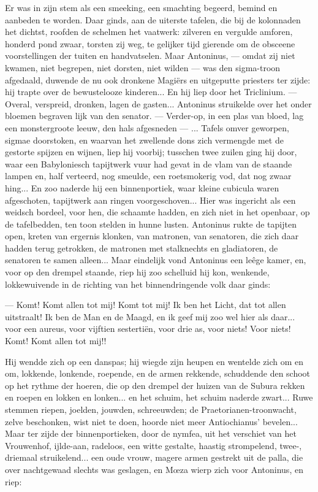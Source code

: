 \documentclass[a4paper, 12pt, oneside, dutch]{article}
\begin{document}
Er was in zijn stem als een smeeking, een smachting begeerd, bemind en aanbeden te worden. Daar ginds, aan de uiterste tafelen, die bij de kolonnaden het dichtst, roofden de schelmen het vaatwerk: zilveren en vergulde amforen, honderd pond zwaar, torsten zij weg, te gelijker tijd gierende om de obsceene voorstellingen der tuiten en handvatselen. Maar Antoninus, --- omdat zij niet kwamen, niet begrepen, niet dorsten, niet wilden --- was den sigma-troon afgedaald, duwende de nu ook dronkene Magiërs en uitgeputte priesters ter zijde: hij trapte over de bewustelooze kinderen... En hij liep door het Triclinium. --- Overal, verspreid, dronken, lagen de gasten... Antoninus struikelde over het onder bloemen begraven lijk van den senator. --- Verder-op, in een plas van bloed, lag een monstergroote leeuw, den hals afgesneden --- ... Tafels omver geworpen, sigmae doorstoken, en waarvan het zwellende dons zich vermengde met de gestorte spijzen en wijnen, liep hij voorbij; tusschen twee zuilen ging hij door, waar een Babyloniesch tapijtwerk vuur had gevat in de vlam van de staande lampen en, half verteerd, nog smeulde, een roetsmokerig vod, dat nog zwaar hing... En zoo naderde hij een binnenportiek, waar kleine cubicula waren afgeschoten, tapijtwerk aan ringen voorgeschoven... Hier was ingericht als een weidsch bordeel, voor hen, die schaamte hadden, en zich niet in het openbaar, op de tafelbedden, ten toon stelden in hunne lusten. Antoninus rukte de tapijten open, kreten van ergernis klonken, van matronen, van senatoren, die zich daar hadden terug getrokken, de matronen met stalknechts en gladiatoren, de senatoren te samen alleen... Maar eindelijk vond Antoninus een leêge kamer, en, voor op den drempel staande, riep hij zoo schelluid hij kon, wenkende, lokkewuivende in de richting van het binnendringende volk daar ginds:

--- Komt! Komt allen tot mij! Komt tot mij! Ik ben het Licht, dat tot allen uitstraalt! Ik ben de Man en de Maagd, en ik geef mij zoo wel hier als daar... voor een aureus, voor vijftien sestertiën, voor drie as, voor niets! Voor niets! Komt! Komt allen tot mij!!

Hij wendde zich op een danspas; hij wiegde zijn heupen en wentelde zich om en om, lokkende, lonkende, roepende, en de armen rekkende, schuddende den schoot op het rythme der hoeren, die op den drempel der huizen van de Subura rekken en roepen en lokken en lonken... en het schuim, het schuim naderde zwart... Ruwe stemmen riepen, joelden, jouwden, schreeuwden; de Praetorianen-troonwacht, zelve beschonken, wist niet te doen, hoorde niet meer Antiochianus' bevelen... Maar ter zijde der binnenportieken, door de nymfea, uit het verschiet van het Vrouwenhof, ijlde-aan, radeloos, een witte gestalte, haastig strompelend, twee-, driemaal struikelend... een oude vrouw, magere armen gestrekt uit de palla, die over nachtgewaad slechts was geslagen, en Mœza wierp zich voor Antoninus, en riep:
\end{document}
